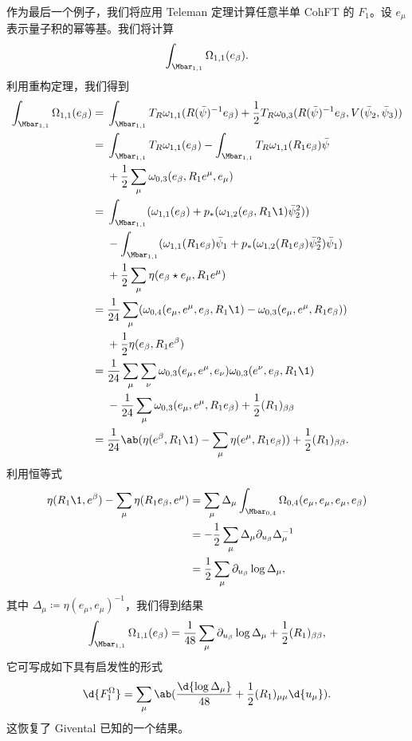 \begin{exm}
    作为最后一个例子，我们将应用 Teleman 定理计算任意半单 CohFT 的 $F_1$。设 $e_{\mu}$ 表示量子积的幂等基。我们将计算
    \[ \int_{\Mbar_{1,1}} \Omega_{1,1}(e_{\beta}). \]
    利用重构定理，我们得到
    \begin{align*}
        \int_{\Mbar_{1,1}}\Omega_{1,1}(e_{\beta}) ={}& \int_{\Mbar_{1,1}} T_R \omega_{1,1}(R(\bar{\psi})^{-1} e_{\beta}) + \frac{1}{2} T_R \omega_{0,3}(R(\bar{\psi})^{-1} e_{\beta}, V(\bar{\psi}_2, \bar{\psi}_3)) \\
        ={}& \int_{\Mbar_{1,1}}T_R\omega_{1,1}(e_{\beta}) - \int_{\Mbar_{1,1}} T_R \omega_{1,1}(R_1 e_{\beta})\bar{\psi} \\ 
        &+ \frac{1}{2}\sum_{\mu}  \omega_{0,3}(e_{\beta}, R_1 e^{\mu}, e_{\mu}) \\
        ={}& \int_{\Mbar_{1,1}} ( \omega_{1,1}(e_{\beta}) + p_* ( \omega_{1,2}(e_{\beta}, R_1 \1) \bar{\psi}_2^2 )) \\
        &- \int_{\Mbar_{1,1}} (\omega_{1,1}(R_1 e_{\beta})\bar{\psi}_1 + p_* ( \omega_{1,2}(R_1 e_{\beta}) \bar{\psi}_2^2 ) \bar{\psi}_1) \\
        &+ \frac{1}{2} \sum_{\mu} \eta(e_{\beta} \star e_{\mu}, R_1 e^{\mu}) \\
        ={}& \frac{1}{24} \sum_{\mu} ( \omega_{0,4}(e_{\mu}, e^{\mu}, e_{\beta}, R_1 \1) -\omega_{0,3}(e_{\mu}, e^{\mu}, R_1 e_{\beta}) )\\
        &+ \frac{1}{2} \eta(e_{\beta}, R_1 e^{\beta}) \\
        ={}& \frac{1}{24} \sum_{\mu}\sum_{\nu} \omega_{0,3}(e_{\mu}, e^{\mu}, e_{\nu})\omega_{0,3}(e^{\nu}, e_{\beta}, R_1 \1) \\
        &-\frac{1}{24} \sum_{\mu} \omega_{0,3}(e_{\mu}, e^{\mu}, R_1 e_{\beta}) + \frac{1}{2} (R_1)_{\beta\beta} \\
        ={}& \frac{1}{24} \ab(\eta(e^{\beta}, R_1 \1) - \sum_{\mu} \eta(e^{\mu}, R_1 e_{\beta})) + \frac{1}{2} (R_1)_{\beta\beta}.
    \end{align*}
    利用恒等式
    \begin{align*}
        \eta(R_1 \1, e^{\beta}) - \sum_{\mu} \eta(R_1 e_{\beta}, e^{\mu}) &= \sum_{\mu} \Delta_{\mu} \int_{\Mbar_{0,4}} \Omega_{0,4}(e_{\mu}, e_{\mu}, e_{\mu}, e_{\beta}) \\
        &= -\frac{1}{2}\sum_{\mu} \Delta_{\mu} \partial_{u_{\beta}} \Delta_{\mu}^{-1} \\
        &= \frac{1}{2} \sum_{\mu} \partial_{u_{\beta}} \log \Delta_{\mu},
    \end{align*}
    其中 $\Delta_{\mu} \coloneqq \eta(e_{\mu}, e_{\mu})^{-1}$，我们得到结果
    \[ \int_{\Mbar_{1,1}} \Omega_{1,1}(e_{\beta}) = \frac{1}{48} \sum_{\mu} \partial_{u_{\beta}} \log \Delta_{\mu} + \frac{1}{2} (R_1)_{\beta\beta}, \]
    它可写成如下具有启发性的形式
    \[ \d{F_1^{\Omega}} = \sum_{\mu} \ab( \frac{\d{\log \Delta_{\mu}}}{48} + \frac{1}{2} (R_1)_{\mu\mu} \d{u_{\mu}} ). \]
    这恢复了 Givental 已知的一个结果。
\end{exm}

